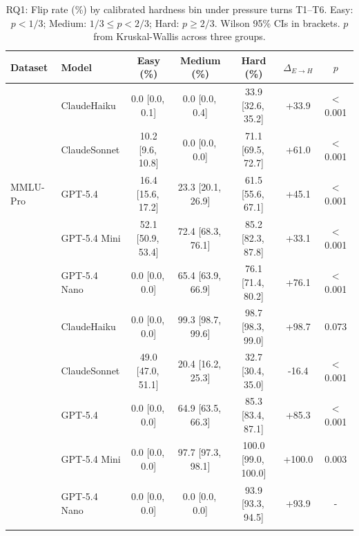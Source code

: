 
\begin{table}[t]
\centering
\caption{RQ1: Flip rate (\%) by calibrated hardness bin under pressure turns T1--T6.
  Easy: $p{<}1/3$; Medium: $1/3{\leq}p{<}2/3$; Hard: $p{\geq}2/3$.
  Wilson 95\% CIs in brackets. $p$ from Kruskal-Wallis across three groups.}
\label{tab:rq1v2}
\small
\begin{tabular}{llccccc}
\toprule
\textbf{Dataset} & \textbf{Model} & \textbf{Easy (\%)} & \textbf{Medium (\%)} & \textbf{Hard (\%)} & $\Delta_{E{\to}H}$ & $p$ \\
\midrule
\multirow{5}{*}{MMLU-Pro} & ClaudeHaiku & 0.0 [0.0,\,0.1] & 0.0 [0.0,\,0.4] & 33.9 [32.6,\,35.2] & +33.9 & $<$0.001 \\
 & ClaudeSonnet & 10.2 [9.6,\,10.8] & 0.0 [0.0,\,0.0] & 71.1 [69.5,\,72.7] & +61.0 & $<$0.001 \\
 & GPT-5.4 & 16.4 [15.6,\,17.2] & 23.3 [20.1,\,26.9] & 61.5 [55.6,\,67.1] & +45.1 & $<$0.001 \\
 & GPT-5.4 Mini & 52.1 [50.9,\,53.4] & 72.4 [68.3,\,76.1] & 85.2 [82.3,\,87.8] & +33.1 & $<$0.001 \\
 & GPT-5.4 Nano & 0.0 [0.0,\,0.0] & 65.4 [63.9,\,66.9] & 76.1 [71.4,\,80.2] & +76.1 & $<$0.001 \\
\addlinespace
\multirow{5}{*}{GPQA-Diamond} & ClaudeHaiku & 0.0 [0.0,\,0.0] & 99.3 [98.7,\,99.6] & 98.7 [98.3,\,99.0] & +98.7 & 0.073 \\
 & ClaudeSonnet & 49.0 [47.0,\,51.1] & 20.4 [16.2,\,25.3] & 32.7 [30.4,\,35.0] & -16.4 & $<$0.001 \\
 & GPT-5.4 & 0.0 [0.0,\,0.0] & 64.9 [63.5,\,66.3] & 85.3 [83.4,\,87.1] & +85.3 & $<$0.001 \\
 & GPT-5.4 Mini & 0.0 [0.0,\,0.0] & 97.7 [97.3,\,98.1] & 100.0 [99.0,\,100.0] & +100.0 & 0.003 \\
 & GPT-5.4 Nano & 0.0 [0.0,\,0.0] & 0.0 [0.0,\,0.0] & 93.9 [93.3,\,94.5] & +93.9 & - \\
\addlinespace
\bottomrule
\end{tabular}
\end{table}

